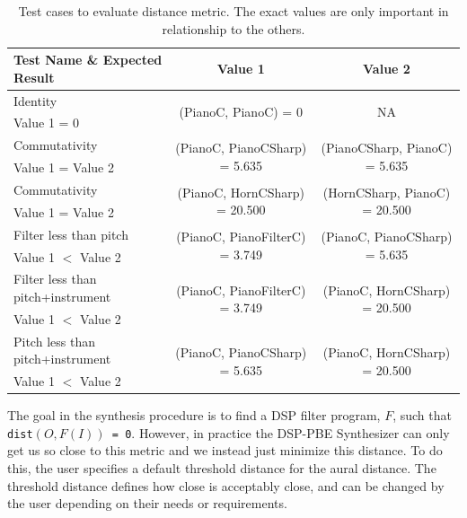 \begin{table}[!h]
\centering
\begin{tabular}{|l | c | c|} 
 \hline
 Test Name \& Expected Result & Value 1 & Value 2 \\
 \hline
 \hline
 Identity & \multirow{2}{*}{(PianoC, PianoC) = 0} & \multirow{2}{*}{NA}\\ 
   \quad Value 1 = 0 &  & \\
 \hline
 Commutativity & \multirow{2}{*}{(PianoC, PianoCSharp) = 5.635} & \multirow{2}{*}{(PianoCSharp, PianoC) = 5.635} \\
   \quad Value 1 = Value 2  & & \\
 \hline
 Commutativity & \multirow{2}{*}{(PianoC, HornCSharp) = 20.500} & \multirow{2}{*}{(HornCSharp, PianoC) = 20.500} \\
   \quad  Value 1 = Value 2 & & \\
 \hline
 Filter less than pitch & \multirow{2}{*}{(PianoC, PianoFilterC) = 3.749} & \multirow{2}{*}{(PianoC, PianoCSharp) = 5.635} \\ 
   \quad Value 1 $<$ Value 2 & & \\
 \hline
 Filter less than pitch+instrument & \multirow{2}{*}{(PianoC, PianoFilterC) = 3.749} & \multirow{2}{*}{(PianoC, HornCSharp) = 20.500} \\
   \quad Value 1 $<$ Value 2 & & \\
 \hline
 Pitch less than pitch+instrument & \multirow{2}{*}{(PianoC, PianoCSharp) = 5.635} & \multirow{2}{*}{(PianoC, HornCSharp) = 20.500} \\
   \quad Value 1 $<$ Value 2 & & \\
 \hline
\end{tabular}
\caption{Test cases to evaluate distance metric. The exact values are only important in relationship to the others.}
\label{table:dist}
\end{table}


The goal in the synthesis procedure is to find a DSP filter program, $F$, such that \texttt{dist$(O, F(I))$ = 0}.
However, in practice the DSP-PBE Synthesizer can only get us so close to this metric and we instead just minimize this distance.
To do this, the user specifies a default threshold distance for the aural distance.
The threshold distance defines how close is acceptably close, and can be changed by the user depending on their needs or requirements.

